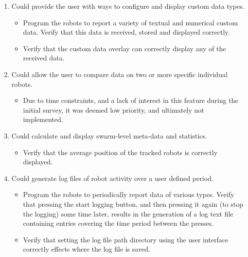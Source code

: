 \begin{enumerate}[label=S\arabic*.]
 \item Could provide the user with ways to configure and display custom data types.
 \begin{itemize}
  \item Program the robots to report a variety of textual and numerical custom data. Verify that this data is received, stored and displayed correctly.
  \item Verify that the custom data overlay can correctly display any of the received data.
 \end{itemize}
 
 \item Could allow the user to compare data on two or more specific individual robots.
 \begin{itemize}
  \item Due to time constraints, and a lack of interest in this feature during the initial survey, it was deemed low priority, and ultimately not implemented.
 \end{itemize}
 
 \item Could calculate and display swarm-level meta-data and statistics.
 \begin{itemize}
  \item Verify that the average position of the tracked robots is correctly displayed.
 \end{itemize}
 
 \item Could generate log files of robot activity over a user defined period.
 \begin{itemize}
  \item Program the robots to periodically report data of various types. Verify that pressing the start logging button, and then pressing it again (to stop the logging) some time later, results in the generation of a log text file containing entries covering the time period between the presses.
  \item Verify that setting the log file path directory using the user interface correctly effects where the log file is saved.
 \end{itemize}
\end{enumerate}

